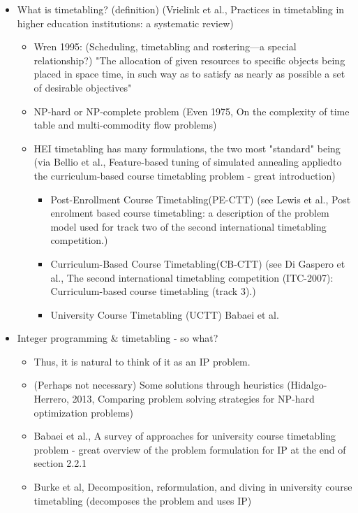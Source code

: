 \documentclass[a4paper]{report}
\begin{document}
\begin{itemize}
    \item What is timetabling? (definition) (Vrielink et al., Practices in timetabling in higher education institutions: a systematic review)
	\begin{itemize}
	    \item Wren 1995: (Scheduling, timetabling and rostering—a special relationship?) "The allocation of given resources to specific objects being placed in space time, in such way as to satisfy as nearly as possible a set of desirable objectives"
	    \item NP-hard or NP-complete problem (Even 1975, On the complexity of time table and multi-commodity flow problems)
	    \item HEI timetabling has many formulations, the two most "standard" being (via Bellio et al., Feature-based tuning of simulated annealing appliedto the curriculum-based course timetabling problem - great introduction)
		\begin{itemize}
		    \item Post-Enrollment Course Timetabling(PE-CTT) (see Lewis et al., Post enrolment based course timetabling: a description of the problem model used for track two of the second international timetabling competition.)
		    \item Curriculum-Based Course Timetabling(CB-CTT) (see Di Gaspero et al., The second international timetabling competition (ITC-2007): Curriculum-based course timetabling (track 3).)
		    \item University Course Timetabling (UCTT) Babaei et al.
		\end{itemize}
	\end{itemize}
    \item Integer programming \& timetabling - so what?
	\begin{itemize}
	    \item Thus, it is natural to think of it as an IP problem.
	    \item (Perhaps not necessary) Some solutions through heuristics (Hidalgo-Herrero, 2013, Comparing problem solving strategies for NP-hard optimization problems)
	    \item Babaei et al., A survey of approaches for university course timetabling problem - great overview of the problem formulation for IP at the end of section 2.2.1
	    \item Burke et al, Decomposition, reformulation, and diving in university course timetabling (decomposes the problem and uses IP)
	\end{itemize}
\end{itemize}
 
\end{document}

